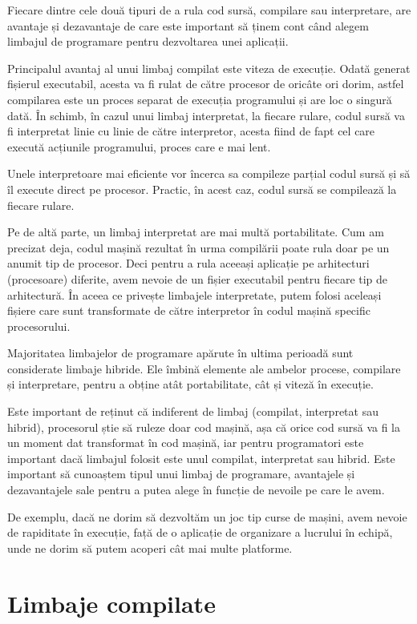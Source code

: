 Fiecare dintre cele două tipuri de a rula cod sursă, compilare sau interpretare,
are avantaje și dezavantaje de care este important să ținem cont când alegem
limbajul de programare pentru dezvoltarea unei aplicații.

Principalul avantaj al unui limbaj compilat este viteza de execuție. Odată
generat fișierul executabil, acesta va fi rulat de către procesor de oricâte ori
dorim, astfel compilarea este un proces separat de execuția programului și are
loc o singură dată. În schimb, în cazul unui limbaj interpretat, la fiecare
rulare, codul sursă va fi interpretat linie cu linie de către
interpretor, acesta fiind de fapt cel care execută acțiunile programului, proces
care e mai lent.

Unele interpretoare mai eficiente vor încerca sa compileze parțial codul sursă
și să îl execute direct pe procesor. Practic, în acest caz, codul sursă se
compilează la fiecare rulare.

Pe de altă parte, un limbaj interpretat are mai multă portabilitate. Cum am
precizat deja, codul mașină rezultat în urma compilării poate rula doar pe un
anumit tip de procesor. Deci pentru a rula aceeași aplicație pe arhitecturi
(procesoare) diferite, avem nevoie de un fișier executabil pentru fiecare tip de
arhitectură. În aceea ce privește limbajele interpretate, putem folosi aceleași
fișiere care sunt transformate de către interpretor în codul mașină specific
procesorului.

Majoritatea limbajelor de programare apărute în ultima perioadă sunt considerate
limbaje hibride. Ele îmbină elemente ale ambelor procese, compilare și
interpretare, pentru a obține atât portabilitate, cât și viteză în execuție.

Este important de reținut că indiferent de limbaj (compilat, interpretat sau
hibrid), procesorul știe să ruleze doar cod mașină, așa că orice cod sursă va fi
la un moment dat transformat în cod mașină, iar pentru programatori este
important dacă limbajul folosit este unul compilat, interpretat sau hibrid. Este
important să cunoaștem tipul unui limbaj de programare, avantajele și
dezavantajele sale pentru a putea alege în funcție de nevoile pe care le avem.

De exemplu, dacă ne dorim să dezvoltăm un joc tip curse de mașini, avem nevoie
de rapiditate în execuție, față de o aplicație de organizare a lucrului în
echipă, unde ne dorim să putem acoperi cât mai multe platforme.

\section{Limbaje compilate}
\label{sec:appdev:compiled-lang}

